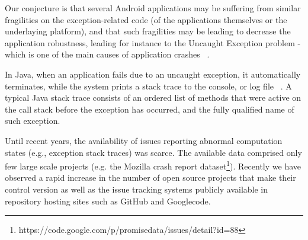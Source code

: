 \documentclass[conference]{IEEEtran}
\begin{document}


Our conjecture is that several Android applications may be suffering from similar 
fragilities on the exception-related code (of the applications themselves or 
the underlaying platform), and that such fragilities may be leading to
decrease the application robustness, leading for instance to the Uncaught Exception problem -
 which is one of the main causes of application crashes ~\cite{jo2004uncaught, zhang2012amplifying}.


In Java, when an application fails due to an uncaught exception, 
it automatically terminates, while the system prints a stack trace to the console, 
or log file ~\cite{gosling2000java}.  A typical Java stack trace consists of an ordered list of 
methods that were active on the call stack before the exception has occurred,  
 and the fully qualified name of such exception.

Until recent years, the availability of issues reporting abnormal
computation states (e.g., exception stack traces) was scarce. The
available data comprised only few large scale projects (e.g. the Mozilla
crash report dataset\footnote{https://code.google.com/p/promisedata/issues/detail?id=88}).
Recently we have observed a rapid increase in the number of open
source projects that make their control version as well as the issue tracking systems
publicly available in repository hosting sites such as GitHub and Googlecode.


\end{document}
